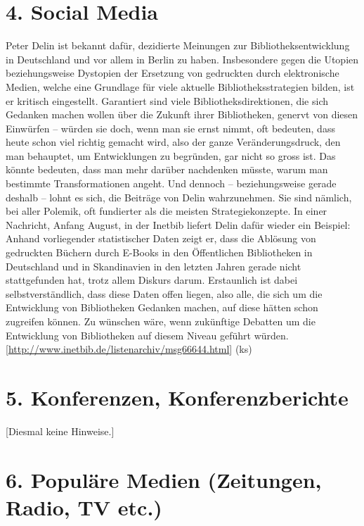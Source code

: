 \documentclass[a4paper,
fontsize=11pt,
oneside,
numbers=noperiodatend,
parskip=half-,
bibliography=totoc,
final
]{scrartcl}
\begin{document}
\hypertarget{social-media}{%
\section{4. Social Media}\label{social-media}}

Peter Delin ist bekannt dafür, dezidierte Meinungen zur
Bibliotheksentwicklung in Deutschland und vor allem in Berlin zu haben.
Insbesondere gegen die Utopien beziehungsweise Dystopien der Ersetzung
von gedruckten durch elektronische Medien, welche eine Grundlage für
viele aktuelle Bibliotheksstrategien bilden, ist er kritisch
eingestellt. Garantiert sind viele Bibliotheksdirektionen, die sich
Gedanken machen wollen über die Zukunft ihrer Bibliotheken, genervt von
diesen Einwürfen -- würden sie doch, wenn man sie ernst nimmt, oft
bedeuten, dass heute schon viel richtig gemacht wird, also der ganze
Veränderungsdruck, den man behauptet, um Entwicklungen zu begründen, gar
nicht so gross ist. Das könnte bedeuten, dass man mehr darüber
nachdenken müsste, warum man bestimmte Transformationen angeht. Und
dennoch -- beziehungsweise gerade deshalb -- lohnt es sich, die Beiträge
von Delin wahrzunehmen. Sie sind nämlich, bei aller Polemik, oft
fundierter als die meisten Strategiekonzepte. In einer Nachricht, Anfang
August, in der Inetbib liefert Delin dafür wieder ein Beispiel: Anhand
vorliegender statistischer Daten zeigt er, dass die Ablösung von
gedruckten Büchern durch E-Books in den Öffentlichen Bibliotheken in
Deutschland und in Skandinavien in den letzten Jahren gerade nicht
stattgefunden hat, trotz allem Diskurs darum. Erstaunlich ist dabei
selbstverständlich, dass diese Daten offen liegen, also alle, die sich
um die Entwicklung von Bibliotheken Gedanken machen, auf diese hätten
schon zugreifen können. Zu wünschen wäre, wenn zukünftige Debatten um
die Entwicklung von Bibliotheken auf diesem Niveau geführt würden.
{[}\url{http://www.inetbib.de/listenarchiv/msg66644.html}{]} (ks)

\hypertarget{konferenzen-konferenzberichte}{%
\section{5. Konferenzen,
Konferenzberichte}\label{konferenzen-konferenzberichte}}

{[}Diesmal keine Hinweise.{]}

\hypertarget{populuxe4re-medien-zeitungen-radio-tv-etc.}{%
\section{6. Populäre Medien (Zeitungen, Radio, TV
etc.)}\label{populuxe4re-medien-zeitungen-radio-tv-etc.}}
\end{document}
